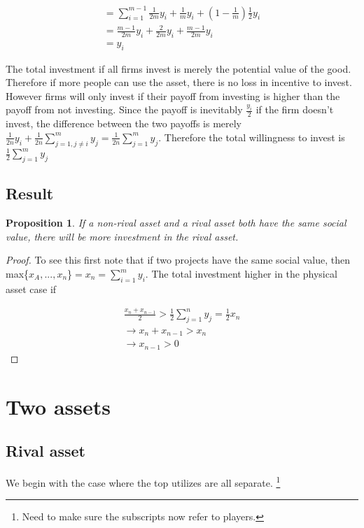 \documentclass{article}
\newtheorem{proposition}{Proposition}
\begin{document}
\begin{align*}
=\sum_{i=1}^{m-1}\frac{1}{2m}y_i+\frac{1}{m}y_i+(1-\frac{1}{m})\frac{1}{2}y_i \\
=\frac{m-1}{2m}y_i+\frac{2}{2m}y_i+\frac{m-1}{2m}y_i \\
= y_i
\end{align*}

The total investment if all firms invest is merely the potential value of the good. Therefore if more people can use the asset, there is no loss in incentive to invest. However firms will only invest if their payoff from investing is higher than the payoff from not investing. Since the payoff is inevitably $\frac{y_i}{2}$ if the firm doesn't invest, the difference between the two payoffs is merely $\frac{1}{2n}y_i+\frac{1}{2n}\sum_{j=1,j\neq i}^my_j=\frac{1}{2n}\sum_{j=1}^my_j$. Therefore the total willingness to invest is $\frac{1}{2}\sum_{j=1}^my_j$

\section{Result}

\begin{proposition}
If a non-rival asset and a rival asset both have the same social value, there will be more investment in the rival asset. 
\end{proposition}

\begin{proof}
To see this first note that if two projects have the same social value, then  max\{$x_A,...,x_n$\}$=x_n=\sum_{i=1}^my_i$. The total investment higher in the physical asset case if 

\begin{align*}
\frac{x_n+x_{n-1}}{2} > \frac{1}{2}\sum_{j=1}^ny_j = \frac{1}{2}x_n \\
\rightarrow x_n+x_{n-1} > x_n \\
\rightarrow x_{n-1} > 0
\end{align*}
\end{proof}

\chapter{Two assets}

\section{Rival asset}
We begin with the case where the top utilizes are all separate. 
\footnote{Need to make sure the subscripts now refer to players.} 
\end{document}
